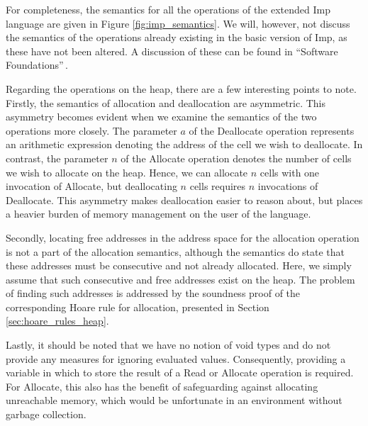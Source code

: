 For completeness, the semantics for all the operations of the extended Imp language are given in Figure \ref{fig:imp_semantics}. We will, however, not discuss the semantics of the operations already existing in the basic version of Imp, as these have not been altered. A discussion of these can be found in ``Software Foundations''\,\cite{Pierce:SF}.

Regarding the operations on the heap, there are a few interesting points to note. Firstly, the semantics of allocation and deallocation are asymmetric. This asymmetry becomes evident when we examine the semantics of the two operations more closely. The parameter $a$ of the Deallocate operation represents an arithmetic expression denoting the address of the cell we wish to deallocate. In contrast, the parameter $n$ of the Allocate operation denotes the number of cells we wish to allocate on the heap. Hence, we can allocate $n$ cells with one invocation of Allocate, but deallocating $n$ cells requires $n$ invocations of Deallocate. This asymmetry makes deallocation easier to reason about, but places a heavier burden of memory management on the user of the language.

Secondly, locating free addresses in the address space for the allocation operation is not a part of the allocation semantics, although the semantics do state that these addresses must be consecutive and not already allocated.  Here, we simply assume that such consecutive and free addresses exist on the heap. The problem of finding such addresses is addressed by the soundness proof of the corresponding Hoare rule for allocation, presented in Section \ref{sec:hoare_rules_heap}.

Lastly, it should be noted that we have no notion of void types and do not provide any measures for ignoring evaluated values. Consequently, providing a variable in which to store the result of a Read or Allocate operation is required. For Allocate, this also has the benefit of safeguarding against allocating unreachable memory, which would be unfortunate in an environment without garbage collection.


